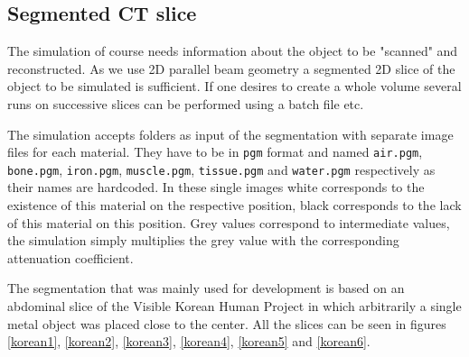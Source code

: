 \subsection{Segmented CT slice}
\par The simulation of course needs information about the object to be "scanned" and reconstructed. As we use 2D parallel beam geometry a segmented 2D slice of the object to be simulated is sufficient. If one desires to create a whole volume several runs on successive slices can be performed using a batch file etc.
\par The simulation accepts folders as input of the segmentation with separate image files for each material. They have to be in \verb!pgm! format and named \verb!air.pgm!, \verb!bone.pgm!, \verb!iron.pgm!, \verb!muscle.pgm!, \verb!tissue.pgm! and \verb!water.pgm! respectively as their names are hardcoded. In these single images white corresponds to the existence of this material on the respective position, black corresponds to the lack of this material on this position. Grey values correspond to intermediate values, the simulation simply multiplies the grey value with the corresponding attenuation coefficient.
\par The segmentation that was mainly used for development is based on an abdominal slice of the Visible Korean Human Project\cite{visibleKorean} in which arbitrarily a single metal object was placed close to the center. All the slices can be seen in figures \ref{korean1}, \ref{korean2}, \ref{korean3}, \ref{korean4}, \ref{korean5} and \ref{korean6}.
